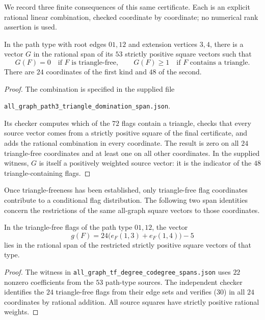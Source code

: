 We record three finite consequences of this same certificate. Each is an
explicit rational linear combination, checked coordinate by coordinate;
no numerical rank assertion is used.

\begin{lemma}\label{lem:triangle-domination}
In the path type with root edges \(01,12\) and extension vertices \(3,4\),
there is a vector \(G\) in the rational span of its \(53\) strictly
positive square vectors such that
\[
 G(F)=0\quad\text{if \(F\) is triangle-free},\qquad
 G(F)\ge1\quad\text{if \(F\) contains a triangle}.
\]
There are \(24\) coordinates of the first kind and \(48\) of the second.
\end{lemma}
\begin{proof}
The combination is specified in the supplied file
\begin{center}
 \texttt{all\_graph\_path3\_triangle\_domination\_span.json}.
\end{center}
Its checker computes which of the \(72\) flags contain a triangle,
checks that every source vector comes from a strictly positive square
of the final certificate, and adds the rational combination in every
coordinate. The result is zero on all \(24\) triangle-free coordinates
and at least one on all other coordinates. In the supplied witness,
\(G\) is itself a positively weighted source vector: it is the indicator
of the \(48\) triangle-containing flags.
\end{proof}

Once triangle-freeness has been established, only triangle-free flag
coordinates contribute to a conditional flag distribution. The following
two span identities concern the restrictions of the same all-graph square
vectors to those coordinates.

\begin{lemma}\label{lem:degree-span}
In the triangle-free flags of the path type \(01,12\), the vector
\begin{equation}
 g(F)=24\bigl(e_F(1,3)+e_F(1,4)\bigr)-5\tag{30}
\end{equation}
lies in the rational span of the restricted strictly positive square
vectors of that type.
\end{lemma}
\begin{proof}
The witness in
\texttt{all\_graph\_tf\_degree\_codegree\_spans.json} uses \(22\) nonzero
coefficients from the \(53\) path-type sources. The independent checker
identifies the \(24\) triangle-free flags from their edge sets and verifies
(30) in all \(24\) coordinates by rational addition. All source squares
have strictly positive rational weights.
\end{proof}

